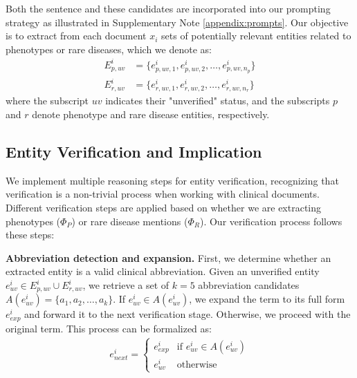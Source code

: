 Both the sentence and these candidates are incorporated into our prompting strategy as illustrated in Supplementary Note \ref{appendix:prompts}. Our objective is to extract from each document $x_i$ sets of potentially relevant entities related to phenotypes or rare diseases, which we denote as:
\begin{align}
E_{p,uv}^i &= \{e_{p,uv,1}^i, e_{p,uv,2}^i, \ldots, e_{p,uv,n_p}^i\} \\
E_{r,uv}^i &= \{e_{r,uv,1}^i, e_{r,uv,2}^i, \ldots, e_{r,uv,n_r}^i\}
\end{align}
where the subscript $uv$ indicates their "unverified" status, and the subscripts $p$ and $r$ denote phenotype and rare disease entities, respectively.

\subsection{Entity Verification and Implication} \label{sec:verify-and-implication-reasoning_ex}
We implement multiple reasoning steps for entity verification, recognizing that verification is a non-trivial process when working with clinical documents. Different verification steps are applied based on whether we are extracting phenotypes ($\Phi_P$) or rare disease mentions ($\Phi_R$). Our verification process follows these steps:

\textbf{Abbreviation detection and expansion.} First, we determine whether an extracted entity is a valid clinical abbreviation. Given an unverified entity $e_{uv}^i \in E_{p,uv}^i \cup E_{r,uv}^i$, we retrieve a set of $k=5$ abbreviation candidates $A(e_{uv}^i) = \{a_1, a_2, \ldots, a_k\}$. If $e_{uv}^i \in A(e_{uv}^i)$, we expand the term to its full form $e_{exp}^i$ and forward it to the next verification stage. Otherwise, we proceed with the original term. This process can be formalized as:
\begin{align}
e_{next}^i = 
\begin{cases}
e_{exp}^i & \text{if } e_{uv}^i \in A(e_{uv}^i) \\
e_{uv}^i & \text{otherwise}
\end{cases}
\end{align}

